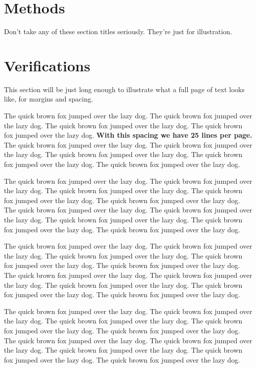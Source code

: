 \documentclass[
  12pt]{article}
\begin{document}
\section{Methods}\label{sec-meth}

Don't take any of these section titles seriously. They're just for
illustration.

\section{Verifications}\label{sec-verify}

This section will be just long enough to illustrate what a full page of
text looks like, for margins and spacing.

\addtolength{\textheight}{.5in}%

The quick brown fox jumped over the lazy dog. The quick brown fox jumped
over the lazy dog. The quick brown fox jumped over the lazy dog. The
quick brown fox jumped over the lazy dog. \textbf{With this spacing we
have 25 lines per page.} The quick brown fox jumped over the lazy dog.
The quick brown fox jumped over the lazy dog. The quick brown fox jumped
over the lazy dog. The quick brown fox jumped over the lazy dog. The
quick brown fox jumped over the lazy dog.

The quick brown fox jumped over the lazy dog. The quick brown fox jumped
over the lazy dog. The quick brown fox jumped over the lazy dog. The
quick brown fox jumped over the lazy dog. The quick brown fox jumped
over the lazy dog. The quick brown fox jumped over the lazy dog. The
quick brown fox jumped over the lazy dog. The quick brown fox jumped
over the lazy dog. The quick brown fox jumped over the lazy dog. The
quick brown fox jumped over the lazy dog.

The quick brown fox jumped over the lazy dog. The quick brown fox jumped
over the lazy dog. The quick brown fox jumped over the lazy dog. The
quick brown fox jumped over the lazy dog. The quick brown fox jumped
over the lazy dog. The quick brown fox jumped over the lazy dog. The
quick brown fox jumped over the lazy dog. The quick brown fox jumped
over the lazy dog. The quick brown fox jumped over the lazy dog. The
quick brown fox jumped over the lazy dog.

The quick brown fox jumped over the lazy dog. The quick brown fox jumped
over the lazy dog. The quick brown fox jumped over the lazy dog. The
quick brown fox jumped over the lazy dog. The quick brown fox jumped
over the lazy dog. The quick brown fox jumped over the lazy dog. The
quick brown fox jumped over the lazy dog. The quick brown fox jumped
over the lazy dog. The quick brown fox jumped over the lazy dog. The
quick brown fox jumped over the lazy dog.
\end{document}
